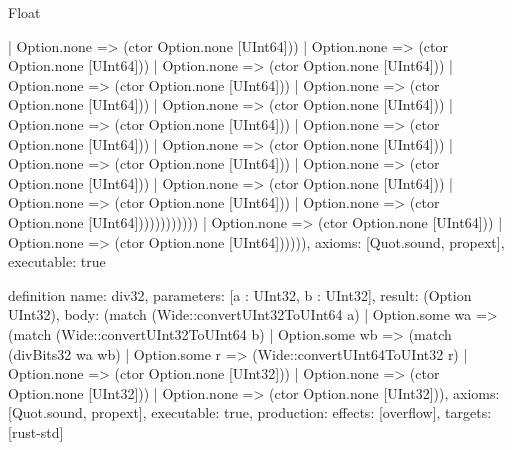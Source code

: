 \begin{lexlean}{Float}
\begin{semanticmodule}
{                                  | Option.none => (ctor Option.none [UInt64]))
                                | Option.none => (ctor Option.none [UInt64]))
                              | Option.none => (ctor Option.none [UInt64]))
                            | Option.none => (ctor Option.none [UInt64]))
                          | Option.none => (ctor Option.none [UInt64]))
                        | Option.none => (ctor Option.none [UInt64]))
                      | Option.none => (ctor Option.none [UInt64]))
                    | Option.none => (ctor Option.none [UInt64]))
                  | Option.none => (ctor Option.none [UInt64]))
                | Option.none => (ctor Option.none [UInt64]))
              | Option.none => (ctor Option.none [UInt64]))
            | Option.none => (ctor Option.none [UInt64]))
          | Option.none => (ctor Option.none [UInt64]))
        | Option.none => (ctor Option.none [UInt64])))))))))))
      | Option.none => (ctor Option.none [UInt64]))
    | Option.none => (ctor Option.none [UInt64]))))),
  axioms: [Quot.sound, propext],
  executable: true
}

definition{
  name: div32,
  parameters: [a : UInt32, b : UInt32],
  result: (Option UInt32),
  body: (match (Wide::convertUInt32ToUInt64 a)
    | Option.some wa => (match (Wide::convertUInt32ToUInt64 b)
      | Option.some wb => (match (divBits32 wa wb)
        | Option.some r => (Wide::convertUInt64ToUInt32 r)
        | Option.none => (ctor Option.none [UInt32]))
      | Option.none => (ctor Option.none [UInt32]))
    | Option.none => (ctor Option.none [UInt32])),
  axioms: [Quot.sound, propext],
  executable: true,
  production: {effects: [overflow], targets: [rust-std]}
}


\end{semanticmodule}
\end{lexlean}
